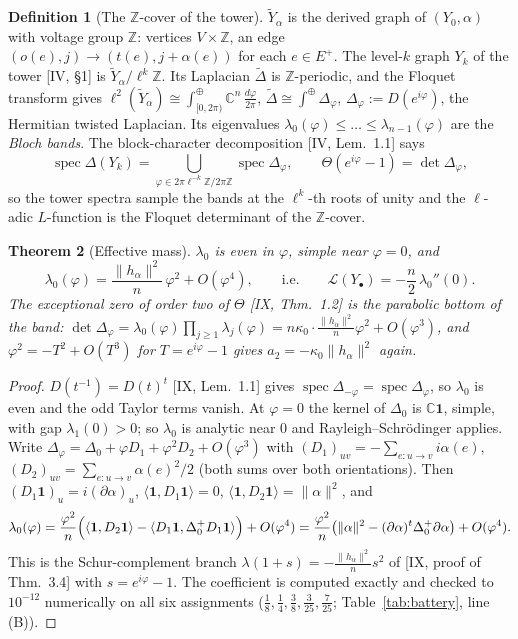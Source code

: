 \documentclass[11pt]{amsart}
\numberwithin{equation}{section}
\newtheorem{theorem}{Theorem}[section]
\theoremstyle{definition}
\newtheorem{definition}[theorem]{Definition}
\theoremstyle{remark}
\newcommand{\Z}{\mathbb{Z}}
\newcommand{\C}{\mathbb{C}}
\newcommand{\cL}{\mathcal{L}}
\begin{document}
\begin{definition}[The $\Z$-cover of the tower]\label{def:cover}
$\widetilde Y_\alpha$ is the derived graph of $(Y_0,\alpha)$ with voltage group $\Z$: vertices
$V\times\Z$, an edge $(o(e),j)\to(t(e),j+\alpha(e))$ for each $e\in E^{+}$. The level-$k$
graph $Y_k$ of the tower [IV, \S1] is $\widetilde Y_\alpha/\ell^{k}\Z$. Its Laplacian
$\widetilde\Delta$ is $\Z$-periodic, and the Floquet transform gives
$\ell^{2}(\widetilde Y_\alpha)\cong\int^{\oplus}_{[0,2\pi)}\C^{n}\,\frac{d\varphi}{2\pi}$,
$\widetilde\Delta\cong\int^{\oplus}\Delta_\varphi$, $\Delta_\varphi:=D(e^{i\varphi})$,
the Hermitian twisted Laplacian. Its eigenvalues $\lambda_0(\varphi)\le\dots\le\lambda_{n-1}(\varphi)$
are the \emph{Bloch bands}. The block-character decomposition [IV, Lem.~1.1] says
\[
\operatorname{spec}\Delta(Y_k)=\bigcup_{\varphi\in2\pi\ell^{-k}\Z/2\pi\Z}\operatorname{spec}\Delta_\varphi ,
\qquad
\Theta(e^{i\varphi}-1)=\det\Delta_\varphi ,
\]
so the tower spectra sample the bands at the $\ell^{k}$-th roots of unity and the
$\ell$-adic $L$-function is the Floquet determinant of the $\Z$-cover.
\end{definition}

\begin{theorem}[Effective mass]\label{thm:bloch}
$\lambda_0$ is even in $\varphi$, simple near $\varphi=0$, and
\[
\lambda_0(\varphi)=\frac{\|h_\alpha\|^{2}}{n}\,\varphi^{2}+O(\varphi^{4}),\qquad\text{i.e.}\qquad
\cL(Y_\bullet)=-\frac n2\,\lambda_0''(0).
\]
The exceptional zero of order two of $\Theta$ {\rm[IX, Thm.~1.2]} is the parabolic bottom of
the band: $\det\Delta_\varphi=\lambda_0(\varphi)\prod_{j\ge1}\lambda_j(\varphi)
=n\kappa_0\cdot\frac{\|h_\alpha\|^{2}}n\varphi^{2}+O(\varphi^{3})$, and $\varphi^{2}=-T^{2}+O(T^{3})$
for $T=e^{i\varphi}-1$ gives $a_2=-\kappa_0\|h_\alpha\|^{2}$ again.
\end{theorem}

\begin{proof}
$D(t^{-1})=D(t)^{t}$ [IX, Lem.~1.1] gives $\operatorname{spec}\Delta_{-\varphi}=
\operatorname{spec}\Delta_\varphi$, so $\lambda_0$ is even and the odd Taylor terms vanish.
At $\varphi=0$ the kernel of $\Delta_0$ is $\C\mathbf1$, simple, with gap $\lambda_1(0)>0$; so
$\lambda_0$ is analytic near $0$ and Rayleigh--Schr\"odinger applies. Write
$\Delta_\varphi=\Delta_0+\varphi D_1+\varphi^{2}D_2+O(\varphi^{3})$ with
$(D_1)_{uv}=-\sum_{e\colon u\to v}i\alpha(e)$, $(D_2)_{uv}=\sum_{e\colon u\to v}\alpha(e)^{2}/2$
(both sums over both orientations). Then $(D_1\mathbf1)_u=i(\partial\alpha)_u$,
$\langle\mathbf1,D_1\mathbf1\rangle=0$, $\langle\mathbf1,D_2\mathbf1\rangle=\|\alpha\|^{2}$, and
\[
\lambda_0(\varphi)=\frac{\varphi^{2}}n\Bigl(\langle\mathbf1,D_2\mathbf1\rangle
-\langle D_1\mathbf1,\Delta_0^{+}D_1\mathbf1\rangle\Bigr)+O(\varphi^{4})
=\frac{\varphi^{2}}n\bigl(\|\alpha\|^{2}-(\partial\alpha)^{t}\Delta_0^{+}\partial\alpha\bigr)+O(\varphi^{4}).
\]
This is the Schur-complement branch $\lambda(1+s)=-\frac{\|h_\alpha\|^{2}}ns^{2}$ of
[IX, proof of Thm.~3.4] with $s=e^{i\varphi}-1$. The coefficient is computed exactly and
checked to $10^{-12}$ numerically on all six assignments ($\frac18,\frac14,\frac38,\frac3{25},\frac7{25}$;
Table~\ref{tab:battery}, line (B)).
\end{proof}
\end{document}
